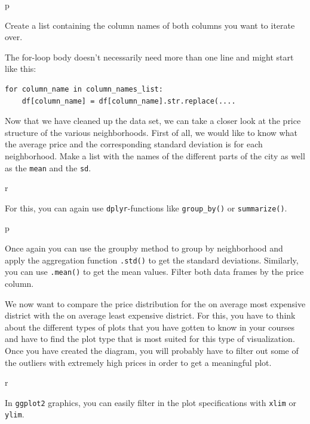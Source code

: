 \documentclass[
  11pt,
]{book}
\begin{document}
\begin{tipsp}p

Create a list containing the column names of both columns you want to
iterate over.

The for-loop body doesn't necessarily need more than one line and might
start like this:

\begin{verbatim}
for column_name in column_names_list:
    df[column_name] = df[column_name].str.replace(....
\end{verbatim}

\end{tipsp}

Now that we have cleaned up the data set, we can take a closer look at
the price structure of the various neighborhoods. First of all, we would
like to know what the average price and the corresponding standard
deviation is for each neighborhood. Make a list with the names of the
different parts of the city as well as the \texttt{mean} and the
\texttt{sd}.

\begin{tips}r

For this, you can again use \texttt{dplyr}-functions like
\texttt{group\_by()} or \texttt{summarize()}.

\end{tips}

\begin{tipsp}p

Once again you can use the groupby method to group by neighborhood and
apply the aggregation function \texttt{.std()} to get the standard
deviations. Similarly, you can use \texttt{.mean()} to get the mean
values. Filter both data frames by the price column.

\end{tipsp}

We now want to compare the price distribution for the on average most
expensive district with the on average least expensive district. For
this, you have to think about the different types of plots that you have
gotten to know in your courses and have to find the plot type that is
most suited for this type of visualization. Once you have created the
diagram, you will probably have to filter out some of the outliers with
extremely high prices in order to get a meaningful plot.

\begin{tips}r

In \texttt{ggplot2} graphics, you can easily filter in the plot
specifications with \texttt{xlim} or \texttt{ylim}.

\end{tips}
\end{document}
